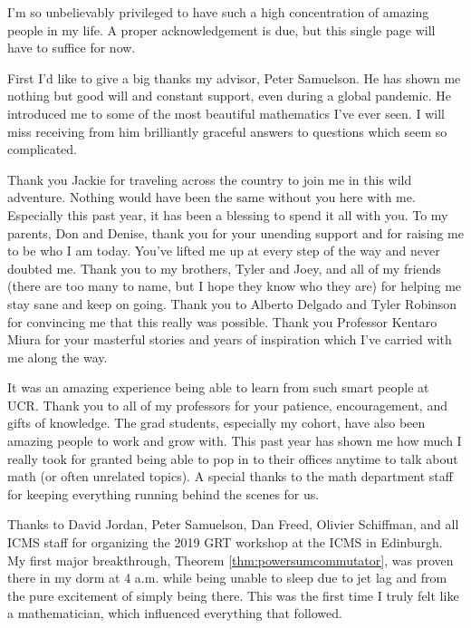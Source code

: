 \begin{acknowledgements}

I'm so unbelievably privileged to have such a high concentration of amazing people in my life. A proper acknowledgement is due, but this single page will have to suffice for now.

First I'd like to give a big thanks my advisor, Peter Samuelson. He has shown me nothing but good will and constant support, even during a global pandemic. He introduced me to some of the most beautiful mathematics I've ever seen. I will miss receiving from him brilliantly graceful answers to questions which seem so complicated. 

Thank you Jackie for traveling across the country to join me in this wild adventure. Nothing would have been the same without you here with me. Especially this past year, it has been a blessing to spend it all with you. To my parents, Don and Denise, thank you for your unending support and for raising me to be who I am today. You've lifted me up at every step of the way and never doubted me. Thank you to my brothers, Tyler and Joey, and all of my friends (there are too many to name, but I hope they know who they are) for helping me stay sane and keep on going. Thank you to Alberto Delgado and Tyler Robinson for convincing me that this really was possible. Thank you Professor Kentaro Miura for your masterful stories and years of inspiration which I've carried with me along the way.

It was an amazing experience being able to learn from such smart people at UCR. Thank you to all of my professors for your patience, encouragement, and gifts of knowledge. The grad students, especially my cohort, have also been amazing people to work and grow with. This past year has shown me how much I really took for granted being able to pop in to their offices anytime to talk about math (or often unrelated topics). A special thanks to the math department staff for keeping everything running behind the scenes for us.

Thanks to David Jordan, Peter Samuelson, Dan Freed, Olivier Schiffman, and all ICMS staff for organizing the 2019 GRT workshop at the ICMS in Edinburgh. My first major breakthrough, Theorem \ref{thm:powersumcommutator}, was proven there in my dorm at 4 a.m. while being unable to sleep due to jet lag and from the pure excitement of simply being there. This was the first time I truly felt like a mathematician, which influenced everything that followed.
\end{acknowledgements}
